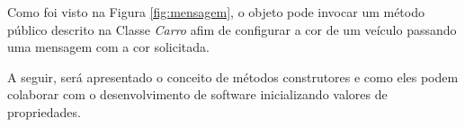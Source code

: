 Como foi visto na Figura \ref{fig:mensagem}, o objeto pode invocar um método
público descrito na Classe \textit{Carro} afim de configurar a cor de um veículo
passando uma mensagem com a cor solicitada.

A seguir, será apresentado o conceito de métodos construtores e como eles podem
colaborar com o desenvolvimento de software inicializando valores de
propriedades.
